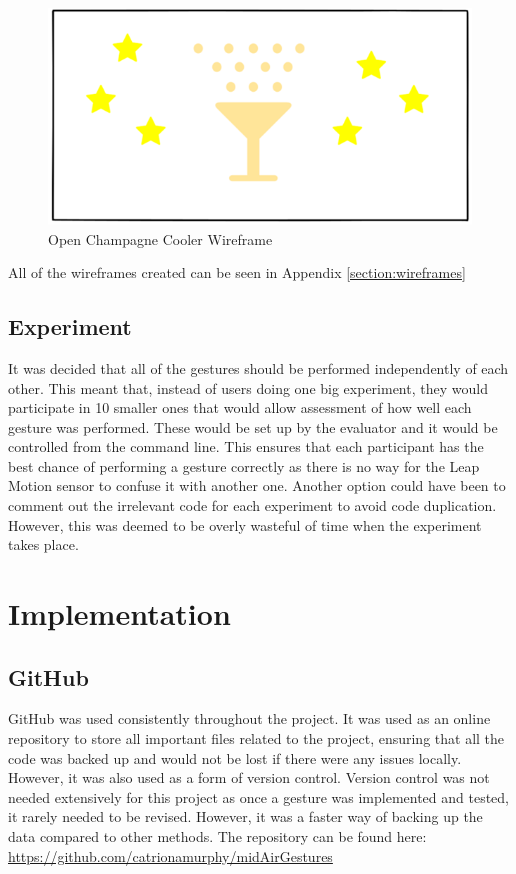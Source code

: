 \documentclass{l4proj}
\begin{document}
\begin{figure}[!htb]
    \centering
    \includegraphics[scale = 0.5]{images/champagneCooler.png}
    \caption{Open Champagne Cooler Wireframe}
    \label{fig:champagne}
\end{figure}

All of the wireframes created can be seen in Appendix \ref{section:wireframes}

\section{Experiment}
\label{section:desExperiment}
It was decided that all of the gestures should be performed independently of each other. This meant that, instead of users doing one big experiment, they would participate in 10 smaller ones that would allow assessment of how well each gesture was performed. These would be set up by the evaluator and it would be controlled from the command line. This ensures that each participant has the best chance of performing a gesture correctly as there is no way for the Leap Motion sensor to confuse it with another one. Another option could have been to comment out the irrelevant code for each experiment to avoid code duplication. However, this was deemed to be overly wasteful of time when the experiment takes place.


\chapter{Implementation}
\section{GitHub}
GitHub was used consistently throughout the project. It was used as an online repository to store all important files related to the project, ensuring that all the code was backed up and would not be lost if there were any issues locally. However, it was also used as a form of version control. Version control was not needed extensively for this project as once a gesture was implemented and tested, it rarely needed to be revised. However, it was a faster way of backing up the data compared to other methods. The repository can be found here: \url{https://github.com/catrionamurphy/midAirGestures}
\end{document}
